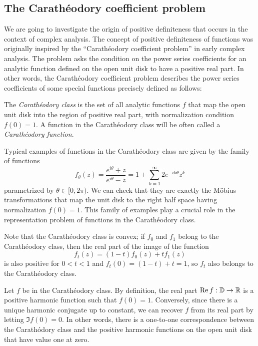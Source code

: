 \documentclass[a4paper]{article}
\begin{document}
\subsection{The Carath\'eodory coefficient problem}

We are going to investigate the origin of positive definiteness that occurs in the context of complex analysis.
The concept of positive definiteness of functions was originally inspired by the ``Carath\'eodory coefficient problem'' in early complex analysis.
The problem asks the condition on the power series coefficients for an analytic function defined on the open unit disk to have a positive real part.
In other words, the Carath\'eodory coefficient problem describes the power series coefficients of some special functions precisely defined as follows:

\begin{defn}
The \emph{Carath\'eodory class} is the set of all analytic functions $f$ that map the open unit disk into the region of positive real part, with normalization condition $f(0)=1$.
A function in the Carath\'eodory class will be often called a \emph{Carath\'eodory function}.
\end{defn}

\begin{ex}
Typical examples of functions in the Carath\'eodory class are given by the family of functions
\[f_\theta(z)=\frac{e^{i\theta}+z}{e^{i\theta}-z}=1+\sum_{k=1}^\infty2e^{-ik\theta}z^k\]
parametrized by $\theta\in[0,2\pi)$.
We can check that they are exactly the M\"obius transformations that map the unit disk to the right half space having normalization $f(0)=1$.
This family of examples play a crucial role in the representation problem of functions in the Carath\'eodory class.
\end{ex}

\begin{ex}
Note that the Carath\'eodory class is convex; if $f_0$ and $f_1$ belong to the Carath\'eodory class, then the real part of the image of the function
\[f_t(z)=(1-t)f_0(z)+tf_1(z)\]
is also positive for $0<t<1$ and $f_t(0)=(1-t)+t=1$, so $f_t$ also belongs to the Carath\'eodory class.
\end{ex}

\begin{ex}
Let $f$ be in the Carath\'eodory class.
By definition, the real part $\operatorname{Re} f:\mathbb{D}\to\mathbb{R}$ is a positive harmonic function such that $f(0)=1$.
Conversely, since there is a unique harmonic conjugate up to constant, we can recover $f$ from its real part by letting $\Im f(0)=0$.
In other words, there is a one-to-one correspondence between the Carath\'odory class and the positive harmonic functions on the open unit disk that have value one at zero.
\end{ex}
\end{document}

